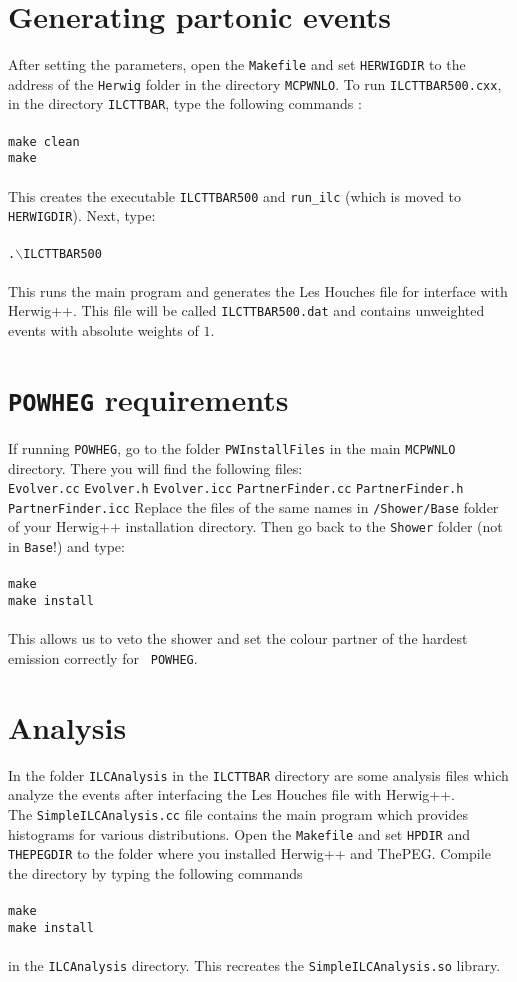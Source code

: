 \documentclass[12pt,a4paper,oneside]{article}
\begin{document}
\section{Generating partonic events}
After setting the parameters, open the {\tt Makefile} and set {\tt HERWIGDIR} to the address of the {\tt Herwig} folder
in the directory {\tt MCPWNLO}. 
To run {\tt ILCTTBAR500.cxx}, in the directory {\tt ILCTTBAR}, type the following commands :\\
\\
{\tt make clean} \\
{\tt make} \\
\\
This creates the executable {\tt ILCTTBAR500} and {\tt run\_ilc} (which is moved to {\tt
  HERWIGDIR}). Next, type: \\
\\
{\tt .$\backslash$ILCTTBAR500} \\ 
\\
This runs the main program and generates the Les Houches file for interface with \textsf{Herwig++}. This file will be called {\tt ILCTTBAR500.dat} and contains unweighted events with absolute weights
of $1$.
\section{{\tt POWHEG} requirements}
If running {\tt POWHEG}, go to the folder {\tt PWInstallFiles} in the main {\tt MCPWNLO}
directory. There you will find the following files:\\
{\tt Evolver.cc} {\tt Evolver.h} {\tt Evolver.icc} {\tt PartnerFinder.cc}  {\tt PartnerFinder.h}  {\tt PartnerFinder.icc}
Replace the files of the same names in {\tt /Shower/Base} folder of your \textsf{Herwig++}
installation directory. Then go back to the {\tt Shower} folder (not in {\tt Base}!) and type: \\
\\
{\tt make} \\
{\tt make install} \\
\\
This allows us to veto the shower and set the colour partner of the hardest emission correctly for {\tt
  POWHEG}.
\section{Analysis} 

In the folder {\tt ILCAnalysis} in the {\tt ILCTTBAR} directory are some analysis files
which analyze the events after interfacing the Les Houches file with
\textsf{Herwig++}. \\ The
{\tt SimpleILCAnalysis.cc} file contains the main program which provides
histograms for various distributions. Open the {\tt Makefile} and set {\tt HPDIR} and
{\tt THEPEGDIR} to the folder where you installed \textsf{Herwig++} and \textsf{ThePEG}. Compile the directory by typing the following commands\\
\\
{\tt make} \\
{\tt make install} \\
\\
in the {\tt ILCAnalysis} directory. This recreates the {\tt SimpleILCAnalysis.so} library.
\end{document}
